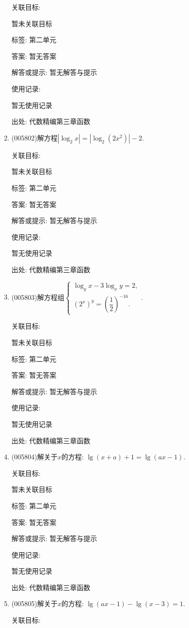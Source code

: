 \documentclass[10pt,a4paper]{article}
\begin{document}
\begin{enumerate}[1.]
关联目标:

暂未关联目标



标签: 第二单元

答案: 暂无答案

解答或提示: 暂无解答与提示

使用记录:

暂无使用记录


出处: 代数精编第三章函数
\item { (005802)}解方程$|\log_2x|=|\log_2(2x^2)|-2$.


关联目标:

暂未关联目标



标签: 第二单元

答案: 暂无答案

解答或提示: 暂无解答与提示

使用记录:

暂无使用记录


出处: 代数精编第三章函数
\item { (005803)}解方程组$\begin{cases} \log_yx-3\log_xy=2, \\ (2^x)^y=(\dfrac 12)^{-16}. \end{cases}$.


关联目标:

暂未关联目标



标签: 第二单元

答案: 暂无答案

解答或提示: 暂无解答与提示

使用记录:

暂无使用记录


出处: 代数精编第三章函数
\item { (005804)}解关于$x$的方程: $\lg (x+a)+1=\lg (ax-1)$.


关联目标:

暂未关联目标



标签: 第二单元

答案: 暂无答案

解答或提示: 暂无解答与提示

使用记录:

暂无使用记录


出处: 代数精编第三章函数
\item { (005805)}解关于$x$的方程: $\lg (ax-1)-\lg (x-3)=1$.


关联目标:


\end{enumerate}
\end{document}
